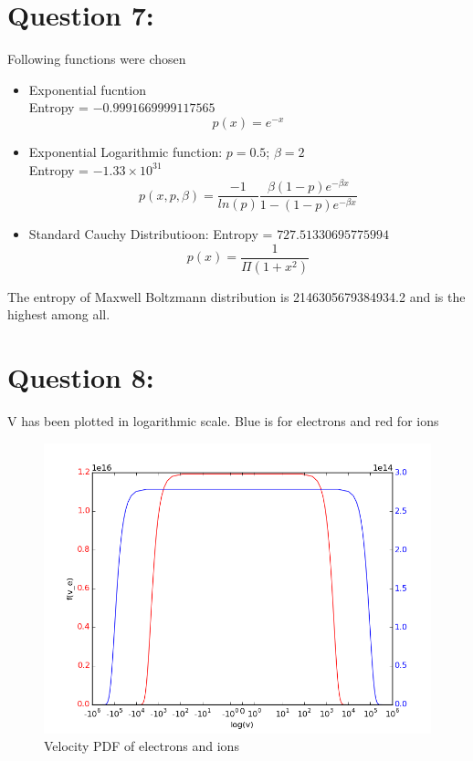 \documentclass[11pt, a4paper]{article}
\begin{document}
\section{Question 7:}
Following functions were chosen
\begin{itemize}
 \item Exponential fucntion \\
  Entropy = $-0.9991669999117565$
 \begin{equation}
  p(x) = e^{-x}
 \end{equation}
 \item Exponential Logarithmic function: $p  = 0.5$; $\beta = 2$\\
  Entropy = $-1.33 \times 10^31$
 \begin{equation}
  p(x, p, \beta) = \frac{-1}{ln(p)} \frac{\beta (1-p)e^{-\beta x}}{1 - (1-p)e^{-\beta x}}
 \end{equation}
 \item Standard Cauchy Distributioon: 
 Entropy = $727.51330695775994$
 \begin{equation}
  p(x) = \frac{1}{\Pi (1+x^{2})}
 \end{equation}
\end{itemize}
The entropy of Maxwell Boltzmann distribution is 2146305679384934.2 and is the highest among all. 

\section{Question 8:}
V has been plotted in logarithmic scale. Blue is for electrons and red for ions
\begin{figure}[H]
 \centering
 \includegraphics[width = \textwidth]{Plasma_vel.png}
 \caption{Velocity PDF of electrons and ions}
 \label{fig:plasma_v}
\end{figure}
\end{document}
